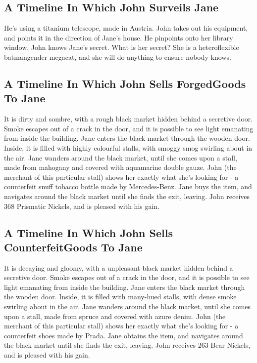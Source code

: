 \documentclass{article}
\begin{document}
\subsection{A Timeline In Which John Surveils Jane}


He's using a titanium telescope, made in Austria.
John takes out his equipment, and points it in the direction of Jane's house. He pinpoints onto her library window.
John knows Jane's secret. What is her secret? She is a heteroflexible batmangender megacat, and she will do anything to ensure nobody knows.
\subsection{A Timeline In Which John Sells ForgedGoods To Jane}


It is dirty and sombre, with a rough black market hidden behind a secretive door.
Smoke escapes out of a crack in the door, and it is possible to see light emanating from inside the building.
Jane enters the black market through the wooden door.
Inside, it is filled with highly colourful stalls, with smoggy smog swirling about in the air.
Jane wanders around the black market, until she comes upon a stall, made from mahogany and covered with aquamarine double gauze.
John (the merchant of this particular stall) shows her exactly what she's looking for {-} a counterfeit snuff tobacco bottle made by Mercedes{-}Benz.
Jane buys the item, and navigates around the black market until she finds the exit, leaving.
John receives 368 Prismatic Nickels, and is pleased with his gain.
\subsection{A Timeline In Which John Sells CounterfeitGoods To Jane}


It is decaying and gloomy, with a unpleasant black market hidden behind a secretive door.
Smoke escapes out of a crack in the door, and it is possible to see light emanating from inside the building.
Jane enters the black market through the wooden door.
Inside, it is filled with many{-}hued stalls, with dense smoke swirling about in the air.
Jane wanders around the black market, until she comes upon a stall, made from spruce and covered with azure denim.
John (the merchant of this particular stall) shows her exactly what she's looking for {-} a counterfeit shoes made by Prada.
Jane obtains the item, and navigates around the black market until she finds the exit, leaving.
John receives 263 Bear Nickels, and is pleased with his gain.
\end{document}
